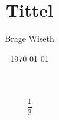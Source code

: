 \documentclass{article}%
\title{Tittel}%
\author{Brage Wiseth}%
\date{\today}%
\begin{document}
%
\normalsize%

$$\frac{1}{2}$$









\end{document}
